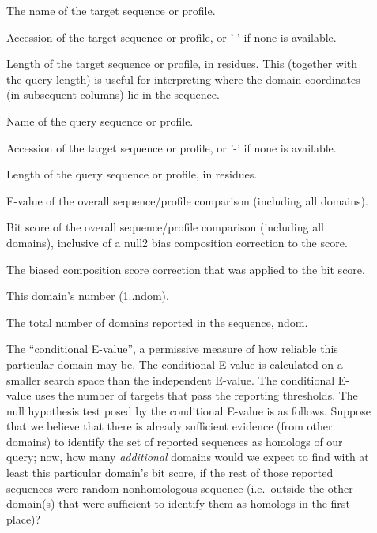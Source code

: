 \begin{description}
\item[] The name of the target sequence or  profile.

\item[] Accession of the target sequence
  or profile, or '-' if none is available. 

\item[] Length of the target sequence or profile, in residues. 
  This (together with the query length) is useful for interpreting
  where the domain coordinates (in subsequent columns) lie in the
  sequence.

\item[] Name of the query sequence or profile.

\item[] Accession of the target sequence or
  profile, or '-' if none is available.

\item[]  Length of the query sequence or profile, in residues.

\item[] E-value of the overall sequence/profile
  comparison (including all domains).

\item[] Bit score of the overall sequence/profile
  comparison (including all domains), inclusive of a null2 bias
  composition correction to the score.

\item[] The biased composition score correction that
  was applied to the bit score.

\item[] This domain's number (1..ndom).

\item[] The total number of domains reported in the
  sequence, ndom.

\item[] The ``conditional E-value'', a
  permissive measure of how reliable this particular domain may be.
  The conditional E-value is calculated on a smaller search space than
  the independent E-value. The conditional E-value uses the number of
  targets that pass the reporting thresholds. The null hypothesis test
  posed by the conditional E-value is as follows. Suppose that we
  believe that there is already sufficient evidence (from other
  domains) to identify the set of reported sequences as homologs of
  our query; now, how many \emph{additional} domains would we expect
  to find with at least this particular domain's bit score, if the
  rest of those reported sequences were random nonhomologous sequence
  (i.e.\ outside the other domain(s) that were sufficient to
  identify them as homologs in the first place)?


\end{description}
